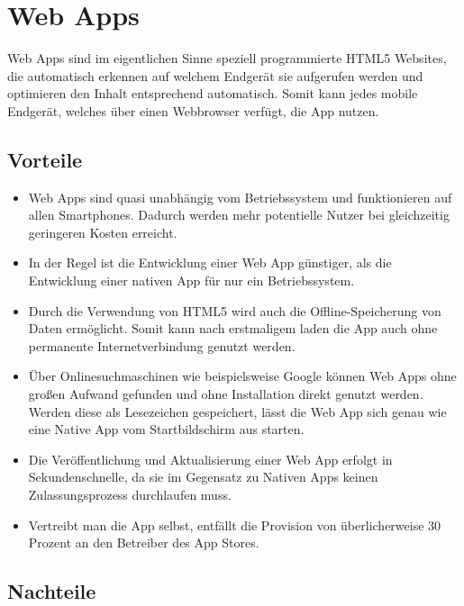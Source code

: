 \section{Web Apps}
\label{sec:intro:webapp}

Web Apps sind im eigentlichen Sinne speziell programmierte \ac{HTML5} Websites, die automatisch erkennen auf welchem Endgerät sie aufgerufen werden und optimieren den Inhalt entsprechend automatisch. Somit kann jedes mobile Endgerät, welches über einen Webbrowser verfügt, die App nutzen.

\subsection{Vorteile}
\label{sec:webapp:pros}

\begin{itemize}

	\item Web Apps sind quasi unabhängig vom Betriebssystem und funktionieren auf allen Smartphones. Dadurch werden mehr potentielle Nutzer bei gleichzeitig geringeren Kosten erreicht.

	\item In der Regel ist die Entwicklung einer Web App günstiger, als die Entwicklung einer nativen App für nur ein Betriebssystem.

	\item Durch die Verwendung von HTML5 wird auch die Offline-Speicherung von Daten ermöglicht. Somit kann nach erstmaligem laden die App auch ohne permanente Internetverbindung genutzt werden.

	\item Über Onlinesuchmaschinen wie beispielsweise Google können Web Apps ohne großen Aufwand gefunden und ohne Installation direkt genutzt werden. Werden diese als Lesezeichen gespeichert, lässt die Web App sich genau wie eine Native App vom Startbildschirm aus starten.

	\item Die Veröffentlichung und Aktualisierung einer Web App erfolgt in Sekundenschnelle, da sie im Gegensatz zu Nativen Apps keinen Zulassungsprozess durchlaufen muss.

	\item Vertreibt man die App selbst, entfällt die Provision von überlicherweise 30 Prozent an den Betreiber des App Stores.

\end{itemize}

\subsection{Nachteile}
\label{sec:webapp:cons}

